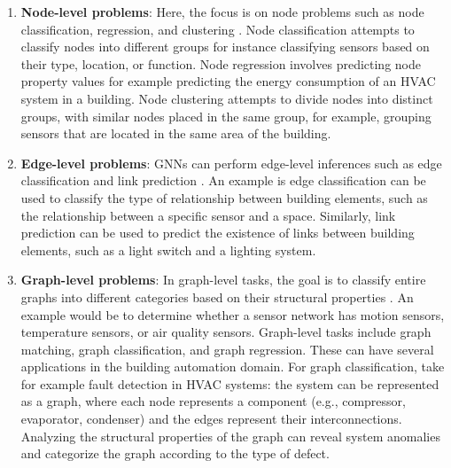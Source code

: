\begin{enumerate}
    \item 
    \textbf{Node-level problems}: Here, the focus is on node problems such as node classification, regression, and clustering \citep{Zhou2020GraphApplications}. Node classification attempts to classify nodes into different groups for instance classifying sensors based on their type, location, or function. Node regression involves predicting node property values for example predicting the energy consumption of an \ac{HVAC} system in a building. Node clustering attempts to divide nodes into distinct groups, with similar nodes placed in the same group, for example, grouping sensors that are located in the same area of the building.

    \item 
    \textbf{Edge-level problems}: \acp{GNN} can perform edge-level inferences such as edge classification and link prediction \citep{Zhou2020GraphApplications}. 
    An example is edge classification can be used to classify the type of relationship between building elements, such as the relationship between a specific sensor and a space. Similarly, link prediction can be used to predict the existence of links between building elements, such as a light switch and a lighting system.

    \item 
    \textbf{Graph-level problems}: In graph-level tasks, the goal is to classify entire graphs into different categories based on their structural properties \citep{Zhou2020GraphApplications}. An example would be to determine whether a sensor network has motion sensors, temperature sensors, or air quality sensors. Graph-level tasks include graph matching, graph classification, and graph regression. These can have several applications in the building automation domain. For graph classification, take for example fault detection in \ac{HVAC} systems: the system can be represented as a graph, where each node represents a component (e.g., compressor, evaporator, condenser) and the edges represent their interconnections. Analyzing the structural properties of the graph can reveal system anomalies and categorize the graph according to the type of defect.
\end{enumerate}

